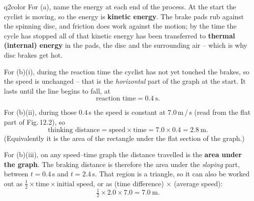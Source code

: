 \documentclass[11pt,a4paper]{article}
\begin{document}
\begin{ansbox}{q2color}
For (a), name the energy at each end of the process. At the start the cyclist is moving, so the energy is \textbf{kinetic energy}. The brake pads rub against the spinning disc, and friction does work against the motion; by the time the cycle has stopped all of that kinetic energy has been transferred to \textbf{thermal (internal) energy} in the pads, the disc and the surrounding air -- which is why disc brakes get hot.

For (b)(i), during the reaction time the cyclist has not yet touched the brakes, so the speed is unchanged -- that is the \emph{horizontal} part of the graph at the start. It lasts until the line begins to fall, at
\[ \text{reaction time} = 0.4\ \mathrm{s}. \]

For (b)(ii), during those $0.4$\,s the speed is constant at $7.0$\,m\,/\,s (read from the flat part of Fig.\,12.2), so
\[ \text{thinking distance} = \text{speed} \times \text{time} = 7.0 \times 0.4 = 2.8\ \mathrm{m}. \]
(Equivalently it is the area of the rectangle under the flat section of the graph.)

For (b)(iii), on any speed--time graph the distance travelled is the \textbf{area under the graph}. The braking distance is therefore the area under the \emph{sloping} part, between $t = 0.4$\,s and $t = 2.4$\,s. That region is a triangle, so it can also be worked out as $\frac{1}{2} \times \text{time} \times \text{initial speed}$, or as (time difference) $\times$ (average speed):
\[ \tfrac{1}{2} \times 2.0 \times 7.0 = 7.0\ \mathrm{m}. \]


\end{ansbox}
\end{document}
